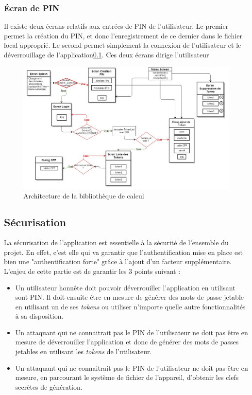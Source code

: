 \subsubsection{Écran de PIN}
Il existe deux écrans relatifs aux entrées de PIN de l'utilisateur. Le premier permet la création
du PIN, et donc l'enregistrement de ce dernier dans le fichier local approprié. Le second permet 
simplement la connexion de l'utilisateur et le déverrouillage de l'application\ref{secu}. Ces deux
écrans dirige l'utilisateur 


\begin{figure}
  \centering
  \includegraphics[scale=0.4]{../graphics/archi-android.jpg}
  \caption{Architecture de la bibliothèque de calcul}
  \label{fig:umlLib}
\end{figure}

\subsection{Sécurisation}
\label{secu}
La sécurisation de l'application est essentielle à la sécurité de l'ensemble du projet. En
effet, c'est elle qui va garantir que l'authentification mise en place est bien une
"authentification forte" grâce à l'ajout d'un facteur supplémentaire. L'enjeu de cette 
partie est de garantir les 3 points suivant : 


\begin{itemize}
  \item[1 -] Un utilisateur honnête doit pouvoir déverrouiller l'application en utilisant 
  sont PIN. Il doit ensuite être en mesure de générer des mots de passe jetable en utilisant
  un de ses \emph{tokens} ou utiliser n'importe quelle autre fonctionnalités à sa
  disposition.
  \item[2 -] Un attaquant qui ne connaitrait pas le PIN de l'utilisateur ne doit pas être en
  mesure de déverrouiller l'application et donc de générer des mots de passes jetables en
  utilisant les \emph{tokens} de l'utilisateur.
  \item[3 -] Un attaquant qui ne connaitrait pas le PIN de l'utilisateur ne doit pas être en
  mesure, en parcourant le système de fichier de l'appareil, d'obtenir les clefs secrètes
  de génération.
\end{itemize}

